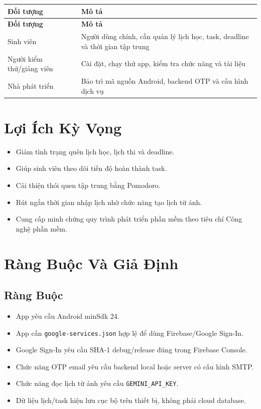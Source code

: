 \documentclass[12pt,a4paper]{report}
\begin{document}
\begin{longtable}{|>{\raggedright\arraybackslash}p{}|>{\raggedright\arraybackslash}p{}|}
\hline
\textbf{Đối tượng} & \textbf{Mô tả} \\ \hline
\endfirsthead
\hline
\textbf{Đối tượng} & \textbf{Mô tả} \\ \hline
\endhead
Sinh viên & Người dùng chính, cần quản lý lịch học, task, deadline và thời gian tập trung \\ \hline
Người kiểm thử/giảng viên & Cài đặt, chạy thử app, kiểm tra chức năng và tài liệu \\ \hline
Nhà phát triển & Bảo trì mã nguồn Android, backend OTP và cấu hình dịch vụ \\ \hline
\end{longtable}

\section{Lợi Ích Kỳ Vọng}

\begin{itemize}
\item Giảm tình trạng quên lịch học, lịch thi và deadline.
\item Giúp sinh viên theo dõi tiến độ hoàn thành task.
\item Cải thiện thói quen tập trung bằng Pomodoro.
\item Rút ngắn thời gian nhập lịch nhờ chức năng tạo lịch từ ảnh.
\item Cung cấp minh chứng quy trình phát triển phần mềm theo tiêu chí Công nghệ phần mềm.
\end{itemize}

\section{Ràng Buộc Và Giả Định}

\subsection{Ràng Buộc}

\begin{itemize}
\item App yêu cầu Android minSdk 24.
\item App cần \texttt{google-services.json} hợp lệ để dùng Firebase/Google Sign-In.
\item Google Sign-In yêu cầu SHA-1 debug/release đúng trong Firebase Console.
\item Chức năng OTP email yêu cầu backend local hoặc server có cấu hình SMTP.
\item Chức năng đọc lịch từ ảnh yêu cầu \texttt{GEMINI\_API\_KEY}.
\item Dữ liệu lịch/task hiện lưu cục bộ trên thiết bị, không phải cloud database.
\end{itemize}
\end{document}
